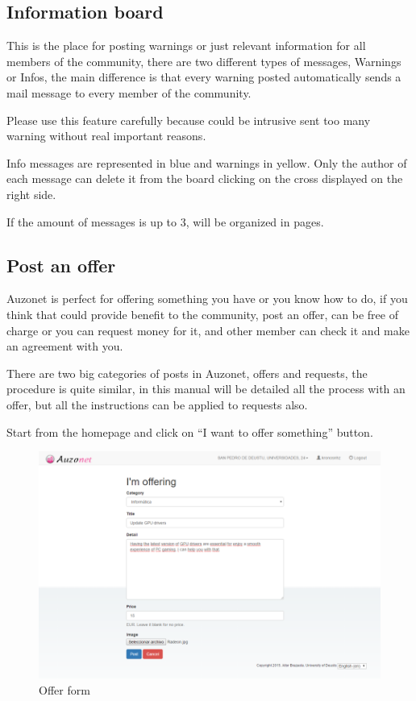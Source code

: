 \documentclass{DeustoFDP}
\begin{document}
\subsection{Information board}
This is the place for posting warnings or just relevant information for all members of the community, there are two different types of messages, Warnings or Infos, the main difference is that every warning posted automatically sends a mail message to every member of the community.

Please use this feature carefully because could be intrusive sent too many warning without real important reasons.

Info messages are represented in blue and warnings in yellow. Only the author of each message can delete it from the board clicking on the cross displayed on the right side.

If the amount of messages is up to 3, will be organized in pages.

\subsection{Post an offer}
Auzonet is perfect for offering something you have or you know how to do, if you think that could provide benefit to the community, post an offer, can be free of charge or you can request money for it, and other member can check it and make an agreement with you.

There are two big categories of posts in Auzonet, offers and requests, the procedure is quite similar, in this manual will be detailed all the process with an offer, but all the instructions can be applied to requests also.

Start from the homepage and click on “I want to offer something” button.

\begin{figure}[h!]
\centering
\includegraphics[width=0.9\linewidth]{fig/Manual/offerform}
\caption[Offer form]{Offer form}
\label{fig:offerform}
\end{figure}
\end{document}
